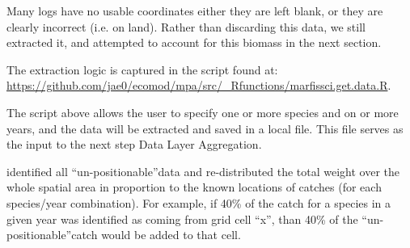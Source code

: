 \documentclass[letterpaper,portrait,11pt]{scrartcl}
\numberwithin{equation}{section}		%
\numberwithin{figure}{section}		%
\numberwithin{table}{section}				%
\begin{document}
Many logs have no usable coordinates \textendash  either they are left blank, or they are clearly incorrect (i.e. on land).  Rather than discarding this data, we still extracted it, and attempted to account for this biomass in the next section.

The extraction logic is captured in the script found at: \\
\url{https://github.com/jae0/ecomod/mpa/src/\_Rfunctions/marfissci.get.data.R}.

The script above allows the user to specify one or more species and on or more years, and the data will be extracted and saved in a local file.  This file serves as the input to the next step \textendash Data Layer Aggregation.

identified all \textquotedblleft un-positionable\textquotedblright  data and re-distributed the total weight over the whole spatial area in proportion to the known locations of catches (for each species/year combination).  For example, if 40\% of the catch for a species in a given year was identified as coming from grid cell \textquotedblleft x\textquotedblright, than 40\% of the \textquotedblleft un-positionable\textquotedblright catch would be added to that cell. 



\clearpage


\end{document}

